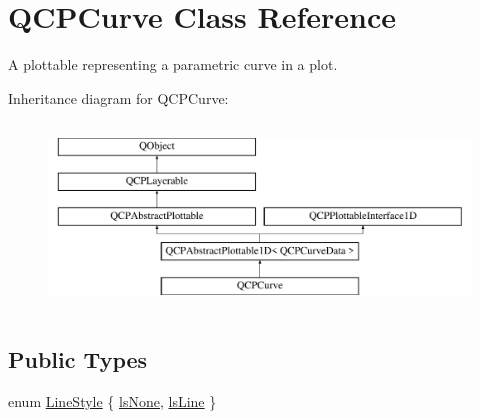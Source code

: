 \hypertarget{class_q_c_p_curve}{}\section{Q\+C\+P\+Curve Class Reference}
\label{class_q_c_p_curve}


A plottable representing a parametric curve in a plot.  


Inheritance diagram for Q\+C\+P\+Curve\+:\begin{figure}[H]
\begin{center}
\leavevmode
\includegraphics[height=5.000000cm]{class_q_c_p_curve}
\end{center}
\end{figure}
\subsection*{Public Types}
\begin{DoxyCompactItemize}
\item 
enum \mbox{\hyperlink{class_q_c_p_curve_a2710e9f79302152cff794c6e16cc01f1}{Line\+Style}} \{ \mbox{\hyperlink{class_q_c_p_curve_a2710e9f79302152cff794c6e16cc01f1aec1601a191cdf0b4e761c4c66092cc48}{ls\+None}}, 
\mbox{\hyperlink{class_q_c_p_curve_a2710e9f79302152cff794c6e16cc01f1ade5822ce6fbf131d3df131795c2e1003}{ls\+Line}}
 \}
\end{DoxyCompactItemize}
